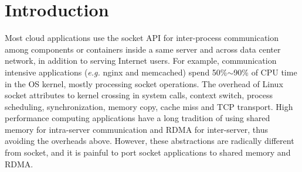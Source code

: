 \section{Introduction}
\label{sec:intro}

Most cloud applications use the socket API for inter-process communication among components or containers inside a same server and across data center network, in addition to serving Internet users. For example, communication intensive applications (\textit{e.g.} nginx and memcached) spend 50\%$\sim$90\% of CPU time in the OS kernel, mostly processing socket operations.
The overhead of Linux socket attributes to kernel crossing in system calls, context switch, process scheduling, synchronization, memory copy, cache miss and TCP transport.
High performance computing applications have a long tradition of using shared memory for intra-server communication and RDMA for inter-server, thus avoiding the overheads above. However, these abstractions are radically different from socket, and it is painful to port socket applications to shared memory and RDMA.


